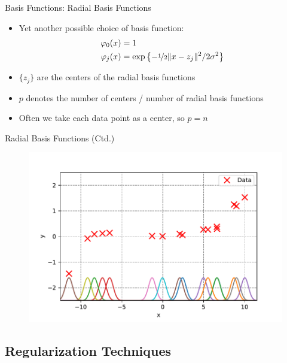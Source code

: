 \begin{frame}{Basis Functions: Radial Basis Functions}{}
	\begin{itemize}
		\item Yet another possible choice of basis function: 
		\begin{align}
			\varphi_0(x) 	&= 1 \\
			\varphi_j(x) 	&= \exp\left\{ - \nicefrac{1}{2} \Vert x - z_j \Vert^2 / 2 \sigma^2 \right\}
		\end{align}
		\item $\{z_j\}$ are the centers of the radial basis functions
		\item $p$ denotes the number of centers / number of radial basis functions
		\item Often we take each data point as a center, so $p = n$
	\end{itemize}
\end{frame}


\begin{frame}{Radial Basis Functions (Ctd.)}{}
	\vspace{-3mm}
	\begin{figure}
		\includegraphics[scale=0.55]{05_regression/02_img/non_linear_data_rbf}
	\end{figure}
\end{frame}


\subsection{Regularization Techniques}

